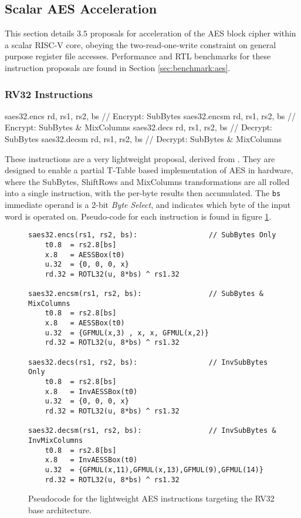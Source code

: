 
\newpage
\subsection{Scalar AES Acceleration}

This section details $3.5$ proposals for acceleration of
the AES block cipher \cite{nist:fips:197} within a scalar RISC-V core,
obeying the two-read-one-write constraint on general purpose register
file accesses.
Performance and RTL benchmarks for these
instruction proposals are found in Section
\ref{sec:benchmark:aes}.

\subsubsection{RV32 Instructions}

\begin{cryptoisa}
saes32.encs      rd, rs1, rs2, bs // Encrypt: SubBytes
saes32.encsm     rd, rs1, rs2, bs // Encrypt: SubBytes & MixColumns
saes32.decs      rd, rs1, rs2, bs // Decrypt: SubBytes
saes32.decsm     rd, rs1, rs2, bs // Decrypt: SubBytes & MixColumns
\end{cryptoisa}

These instructions are a very lightweight proposal, derived from
\cite{MJS:20}.
They are designed to enable a partial T-Table based implementation
of AES in hardware, where the SubBytes, ShiftRows and MixColumns
transformations are all rolled into a single instruction, with the
per-byte results then accumulated.
The {\tt bs} immediate operand is a 2-bit {\em Byte Select}, and indicates
which byte of the input word is operated on.
Pseudo-code for each instruction is found in figure
\ref{fig:pseudo:aes:rv32}.

\begin{figure}[h]
\begin{lstlisting}[language=pseudo]
saes32.encs(rs1, rs2, bs):                 // SubBytes Only
    t0.8  = rs2.8[bs]
    x.8   = AESSBox(t0)
    u.32  = {0, 0, 0, x}
    rd.32 = ROTL32(u, 8*bs) ^ rs1.32

saes32.encsm(rs1, rs2, bs):                // SubBytes & MixColumns
    t0.8  = rs2.8[bs]
    x.8   = AESSBox(t0)
    u.32  = {GFMUL(x,3) , x, x, GFMUL(x,2)}
    rd.32 = ROTL32(u, 8*bs) ^ rs1.32

saes32.decs(rs1, rs2, bs):                 // InvSubBytes Only
    t0.8  = rs2.8[bs]
    x.8   = InvAESSBox(t0)
    u.32  = {0, 0, 0, x}
    rd.32 = ROTL32(u, 8*bs) ^ rs1.32

saes32.decsm(rs1, rs2, bs):                // InvSubBytes & InvMixColumns
    t0.8  = rs2.8[bs]
    x.8   = InvAESSBox(t0)
    u.32  = {GFMUL(x,11),GFMUL(x,13),GFMUL(9),GFMUL(14)}
    rd.32 = ROTL32(u, 8*bs) ^ rs1.32
\end{lstlisting}
\caption{Pseudocode for the lightweight AES instructions targeting the
RV32 base architecture.}
\label{fig:pseudo:aes:rv32}
\end{figure}


